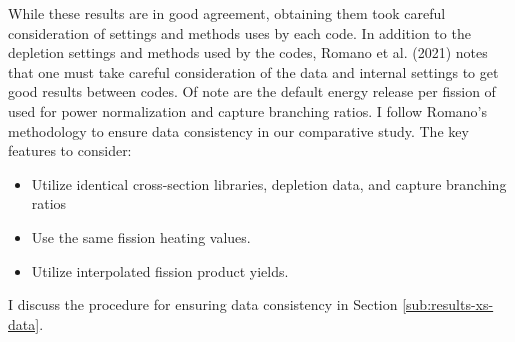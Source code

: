 While these results are in good agreement, obtaining them took careful
consideration of settings and methods uses by each code. In addition to the
depletion settings and methods used by the codes,  Romano et al. (2021) notes
that one must take careful consideration of the data and internal settings to
get good results between codes. Of note are the default energy release per
fission of  used for power normalization and capture branching
ratios. I follow Romano's methodology to ensure data consistency in our
comparative study. The key features to consider:
\begin{itemize}
    \item Utilize identical cross-section libraries, depletion data, and capture
    branching ratios
    \item Use the same fission heating values.
    \item Utilize interpolated fission product yields.
\end{itemize}
I discuss the procedure for ensuring data consistency in Section \ref{sub:results-xs-data}.
